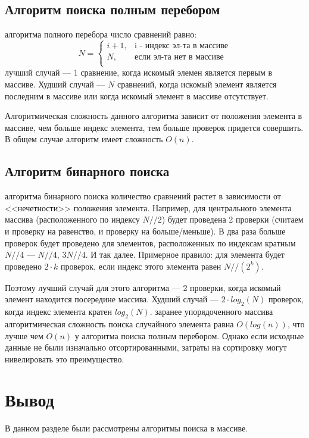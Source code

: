 \documentclass{bmstu}
\begin{document}
\subsection{Алгоритм поиска полным перебором}
 алгоритма полного перебора число сравнений равно:
\begin{equation}
	\label{eq:L}
	N = \begin{cases}
	i + 1, &\text{i - индекс эл-та в массиве}\\
	N, &\text{если эл-та нет в массиве}\\
	\end{cases}
\end{equation}
 лучший случай --- 1 сравнение, когда искомый элемен является первым в массиве. Худший случай --- $N$ сравнений, когда искомый элемент является последним в массиве или когда искомый элемент в массиве отсутствует.
\par Алгоритмическая сложность данного алгоритма зависит от положения элемента в массиве, чем больше индекс элемента, тем больше проверок придется совершить. В общем случае алгоритм имеет сложность $O(n)$.
\subsection{Алгоритм бинарного поиска}
 алгоритма бинарного поиска количество сравнений растет в зависимости от <<нечетности>> положения элемента. Например, для центрального элемента массива (расположенного по индексу $N // 2$) будет проведена 2 проверки (считаем и проверку на равенство, и проверку на больше/меньше). В два раза больше проверок будет проведено для элементов, расположенных по индексам кратным $N // 4$ --- $N // 4$, $3N // 4$. И так далее. Примерное правило: для элемента будет проведено $2 \cdot k$ проверок, если индекс этого элемента равен $N // (2 ^ {k})$.
\par Поэтому лучший случай для этого алгоритма --- 2 проверки, когда искомый элемент находится посередине массива. Худший случай --- $2 \cdot log_2(N)$ проверок, когда индекс элемента кратен $log_2(N)$.
 заранее упорядоченного массива алгоритмическая сложность поиска случайного элемента равна $O(log(n))$, что лучше чем $O(n)$ у алгоритма поиска полным перебором. Однако если исходные данные не были изначально отсортированными, затраты на сортировку могут нивелировать это преимущество.

\section*{Вывод}
В данном разделе были рассмотрены алгоритмы поиска в массиве.
\end{document}
